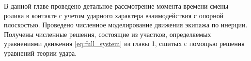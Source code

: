 В данной главе проведено детальное рассмотрение момента времени смены ролика в контакте с учетом ударного характера взаимодействия с опорной плоскостью. Проведено численное моделирование движения экипажа по инерции. Получены численные решения, состоящие из участков, определяемых уравнениями движения \ref{eq:full_system} из главы 1, сшитых с помощью решения уравнений теории удара.
